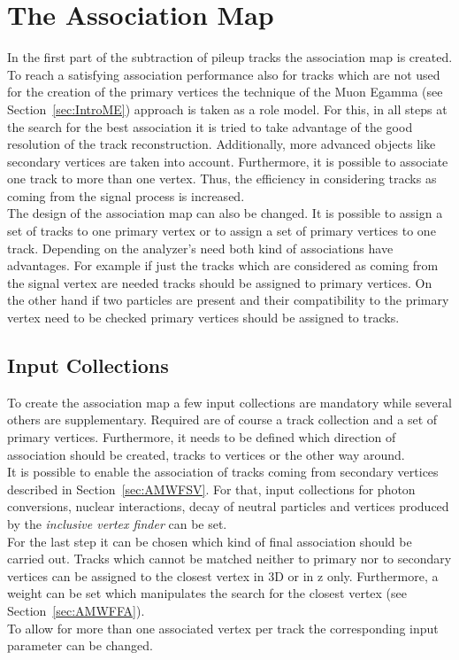 \chapter{The Association Map \label{sec:AssMap}}

In the first part of the subtraction of pileup tracks the association map is created. To reach a satisfying association performance also for tracks which are not used for the creation of the primary vertices the technique of the Muon Egamma (see Section~\ref{sec:IntroME}) approach is taken as a role model. For this, in all steps at the search for the best association it is tried to take advantage of the good resolution of the track reconstruction. Additionally, more advanced objects like secondary vertices are taken into account. Furthermore, it is possible to associate one track to more than one vertex. Thus, the efficiency in considering tracks as coming from the signal process is increased. \\
The design of the association map can also be changed. It is possible to assign a set of tracks to one primary vertex or to assign a set of primary vertices to one track. Depending on the analyzer's need both kind of associations have advantages. For example if just the tracks which are considered as coming from the signal vertex are needed tracks should be assigned to primary vertices. On the other hand if two particles are present and their compatibility to the primary vertex need to be checked primary vertices should be assigned to tracks.

\section{Input Collections \label{sec:AMInColl}}

To create the association map a few input collections are mandatory while several others are supplementary. Required are of course a track collection and a set of primary vertices. Furthermore, it needs to be defined which direction of association should be created, tracks to vertices or the other way around. \\ 
It is possible  to enable the association of tracks coming from secondary vertices described in Section~\ref{sec:AMWFSV}. For that, input collections for photon conversions, nuclear interactions, decay of neutral particles and vertices produced by the \textit{inclusive vertex finder} can be set. \\
For the last step it can be chosen which kind of final association should be carried out. Tracks which cannot be matched neither to primary nor to secondary vertices can be assigned to the closest vertex in 3D or in z only. Furthermore, a weight can be set which manipulates the search for the closest vertex (see Section~\ref{sec:AMWFFA}). \\
To allow for more than one associated vertex per track the corresponding input parameter can be changed.

